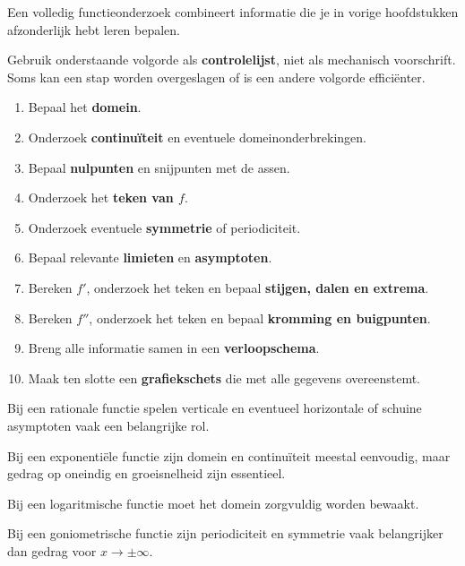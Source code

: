 \documentclass{ximera}
\begin{document}


Een volledig functieonderzoek combineert informatie die je in vorige
hoofdstukken afzonderlijk hebt leren bepalen.

Gebruik onderstaande volgorde als \textbf{controlelijst}, niet als
mechanisch voorschrift. Soms kan een stap worden overgeslagen of is een
andere volgorde efficiënter.

\begin{enumerate}
  \item Bepaal het \textbf{domein}.
  \item Onderzoek \textbf{continuïteit} en eventuele domeinonderbrekingen.
  \item Bepaal \textbf{nulpunten} en snijpunten met de assen.
  \item Onderzoek het \textbf{teken van \(f\)}.
  \item Onderzoek eventuele \textbf{symmetrie} of periodiciteit.
  \item Bepaal relevante \textbf{limieten} en \textbf{asymptoten}.
  \item Bereken \(f'\), onderzoek het teken en bepaal \textbf{stijgen, dalen en extrema}.
  \item Bereken \(f''\), onderzoek het teken en bepaal \textbf{kromming en buigpunten}.
  \item Breng alle informatie samen in een \textbf{verloopschema}.
  \item Maak ten slotte een \textbf{grafiekschets} die met alle gegevens overeenstemt.
\end{enumerate}

\begin{opmerking}
Bij een rationale functie spelen verticale en eventueel horizontale of
schuine asymptoten vaak een belangrijke rol.

Bij een exponentiële functie zijn domein en continuïteit meestal
eenvoudig, maar gedrag op oneindig en groeisnelheid zijn essentieel.

Bij een logaritmische functie moet het domein zorgvuldig worden bewaakt.

Bij een goniometrische functie zijn periodiciteit en symmetrie vaak
belangrijker dan gedrag voor \(x\to\pm\infty\).
\end{opmerking}
\end{document}
